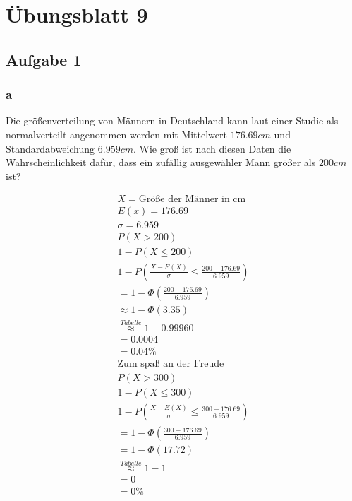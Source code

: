 \chapter{Übungsblatt 9}

\section{Aufgabe 1}

\subsection{a}

Die größenverteilung von Männern in Deutschland kann laut einer Studie als
normalverteilt angenommen werden mit Mittelwert $176.69cm$ und
Standardabweichung $6.959 cm$. Wie groß ist nach diesen Daten die
Wahrscheinlichkeit dafür, dass ein zufällig ausgewähler Mann größer als $200
    cm$ ist?

\begin{align*}
    X = \text{Größe der Männer in cm}                              \\
    E(x) = 176.69                                                  \\
    \sigma = 6.959                                                 \\
    P(X > 200)                                                     \\
    1 - P(X \leq 200)                                              \\
    1 - P(\frac{X - E(X)}{\sigma} \leq \frac{200 - 176.69}{6.959}) \\
    = 1 - \Phi(\frac{200 - 176.69}{6.959})                         \\
    \approx 1 - \Phi(3.35)                                         \\
    \overset{Tabelle}{\approx} 1 - 0.99960                         \\
    = 0.0004                                                       \\
    = 0.04\%                                                       \\
    \text{Zum spaß an der Freude}                                  \\
    P(X > 300)                                                     \\
    1 - P(X \leq 300)                                              \\
    1 - P(\frac{X - E(X)}{\sigma} \leq \frac{300 - 176.69}{6.959}) \\
    = 1 - \Phi(\frac{300 - 176.69}{6.959})                         \\
    = 1 - \Phi(17.72)                                              \\
    \overset{Tabelle}{\approx} 1 - 1                               \\
    = 0                                                            \\
    = 0\%                                                          \\
\end{align*}

